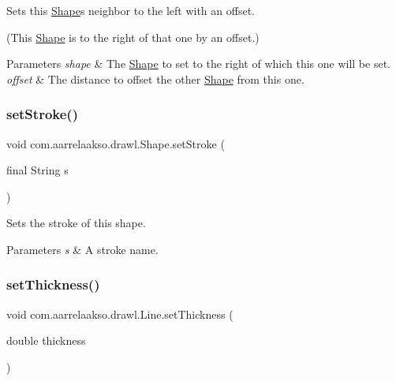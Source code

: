 Sets this \hyperlink{classcom_1_1aarrelaakso_1_1drawl_1_1_shape}{Shape}\textquotesingle{}s neighbor to the left with an offset. 

(This \hyperlink{classcom_1_1aarrelaakso_1_1drawl_1_1_shape}{Shape} is to the right of that one by an offset.)


\begin{DoxyParams}{Parameters}
{\em shape} & The \hyperlink{classcom_1_1aarrelaakso_1_1drawl_1_1_shape}{Shape} to set to the right of which this one will be set. \\
\hline
{\em offset} & The distance to offset the other \hyperlink{classcom_1_1aarrelaakso_1_1drawl_1_1_shape}{Shape} from this one. \\
\hline
\end{DoxyParams}
\mbox{\label{classcom_1_1aarrelaakso_1_1drawl_1_1_shape_a75685cbfea36858836df8e1fb4f8b821}} 
\subsubsection{\texorpdfstring{set\+Stroke()}{setStroke()}}
{\footnotesize\ttfamily void com.\+aarrelaakso.\+drawl.\+Shape.\+set\+Stroke (\begin{DoxyParamCaption}\item[{final String}]{s }\end{DoxyParamCaption})\hspace{0.3cm}{\ttfamily [inherited]}}



Sets the stroke of this shape. 


\begin{DoxyParams}{Parameters}
{\em s} & A stroke name. \\
\hline
\end{DoxyParams}
\mbox{\label{classcom_1_1aarrelaakso_1_1drawl_1_1_line_af58511076072e05cf42641ee44d0d0d7}} 
\subsubsection{\texorpdfstring{set\+Thickness()}{setThickness()}}
{\footnotesize\ttfamily void com.\+aarrelaakso.\+drawl.\+Line.\+set\+Thickness (\begin{DoxyParamCaption}\item[{double}]{thickness }\end{DoxyParamCaption})}

